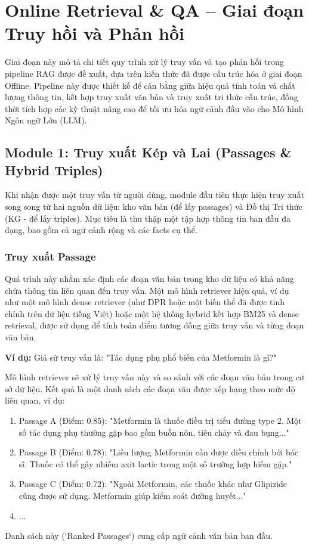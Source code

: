 \documentclass[../main.tex]{subfiles}
\begin{document}
\section{Online Retrieval \& QA – Giai đoạn Truy hồi và Phản hồi}

Giai đoạn này mô tả chi tiết quy trình xử lý truy vấn và tạo phản hồi trong pipeline RAG được đề xuất, dựa trên kiến thức đã được cấu trúc hóa ở giai đoạn Offline. Pipeline này được thiết kế để cân bằng giữa hiệu quả tính toán và chất lượng thông tin, kết hợp truy xuất văn bản và truy xuất tri thức cấu trúc, đồng thời tích hợp các kỹ thuật nâng cao để tối ưu hóa ngữ cảnh đầu vào cho Mô hình Ngôn ngữ Lớn (LLM).

\subsection{Module 1: Truy xuất Kép và Lai (Passages \& Hybrid Triples)}

Khi nhận được một truy vấn từ người dùng, module đầu tiên thực hiện truy xuất song song từ hai nguồn dữ liệu: kho văn bản (để lấy passages) và Đồ thị Tri thức (KG - để lấy triples). Mục tiêu là thu thập một tập hợp thông tin ban đầu đa dạng, bao gồm cả ngữ cảnh rộng và các facts cụ thể.

\subsubsection{Truy xuất Passage}

Quá trình này nhằm xác định các đoạn văn bản trong kho dữ liệu có khả năng chứa thông tin liên quan đến truy vấn. Một mô hình retriever hiệu quả, ví dụ như một mô hình dense retriever (như DPR hoặc một biến thể đã được tinh chỉnh trên dữ liệu tiếng Việt) hoặc một hệ thống hybrid kết hợp BM25 và dense retrieval, được sử dụng để tính toán điểm tương đồng giữa truy vấn và từng đoạn văn bản.

\textbf{Ví dụ:}
Giả sử truy vấn là: "Tác dụng phụ phổ biến của Metformin là gì?"

Mô hình retriever sẽ xử lý truy vấn này và so sánh với các đoạn văn bản trong cơ sở dữ liệu. Kết quả là một danh sách các đoạn văn được xếp hạng theo mức độ liên quan, ví dụ:
\begin{enumerate}
    \item Passage A (Điểm: 0.85): "Metformin là thuốc điều trị tiểu đường type 2. Một số tác dụng phụ thường gặp bao gồm buồn nôn, tiêu chảy và đau bụng..."
    \item Passage B (Điểm: 0.78): "Liều lượng Metformin cần được điều chỉnh bởi bác sĩ. Thuốc có thể gây nhiễm axit lactic trong một số trường hợp hiếm gặp."
    \item Passage C (Điểm: 0.72): "Ngoài Metformin, các thuốc khác như Glipizide cũng được sử dụng. Metformin giúp kiểm soát đường huyết..."
    \item ...
\end{enumerate}
Danh sách này (`Ranked Passages`) cung cấp ngữ cảnh văn bản ban đầu.
\end{document}
